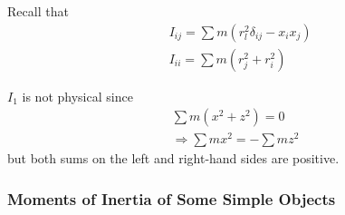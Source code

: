 Recall that 
\[
\begin{aligned}
& I_{ij} = \sum m (r^2_l \delta_{ij} - x_i x_j) \\
& I_{ii} = \sum m (r_j^2 + r_i^2)
\end{aligned}
\]

$I_1$ is not physical since 
\[
\begin{gathered}
\sum m (x^2 + z^2) = 0 \\
\Longrightarrow \sum mx^2 = -\sum mz^2
\end{gathered}
\]
but both sums on the left and right-hand sides are positive.

\subsubsection{Moments of Inertia of Some Simple Objects}


